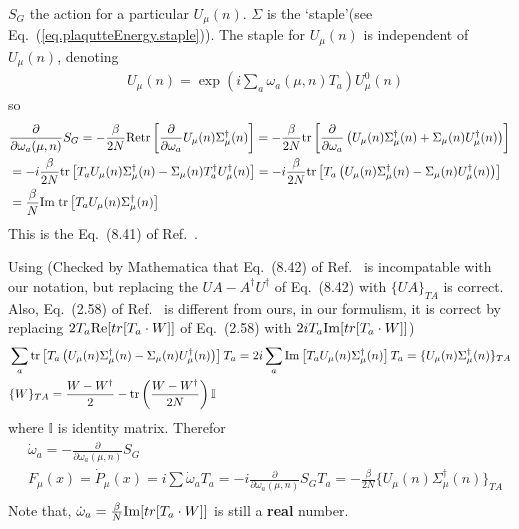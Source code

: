$S_G$ the action for a particular $U_{\mu}(n)$. $\Sigma$ is the `staple'(see Eq.~(\ref{eq.plaqutteEnergy.staple})). The staple for $U_{\mu}(n)$ is independent of $U_{\mu}(n)$, denoting
\begin{equation}
\begin{split}
&U_{\mu}(n)=\exp \left(i \sum _a\omega _a(\mu,n) T_a\right)U_{\mu}^0(n)
\end{split}
\end{equation}
so
\begin{equation}
\begin{split}
&\frac{\partial}{\partial \omega _a (\mu,n)}S_G=-\frac{\beta}{2N}{\rm Re}{\rm tr}\left[\frac{\partial}{\partial \omega _a}U_{\mu}(n)\Sigma ^{\dagger}_{\mu}(n)\right]=-\frac{\beta}{2N}{\rm tr}\left[\frac{\partial}{\partial \omega _a}\left(U_{\mu}(n)\Sigma ^{\dagger}_{\mu}(n)+\Sigma _{\mu}(n)U^{\dagger}_{\mu}(n)\right)\right]\\
&=-i\frac{\beta}{2N}{\rm tr}\left[T_aU_{\mu}(n)\Sigma ^{\dagger}_{\mu}(n)-\Sigma _{\mu}(n)T^{\dagger}_aU^{\dagger}_{\mu}(n)\right]=-i\frac{\beta}{2N}{\rm tr}\left[T_a\left(U_{\mu}(n)\Sigma ^{\dagger}_{\mu}(n)-\Sigma _{\mu}(n)U^{\dagger}_{\mu}(n)\right)\right]\\
&=\frac{\beta}{N} {\rm Im\;tr}\left[T_aU_{\mu}(n)\Sigma ^{\dagger}_{\mu}(n)\right]\\
\end{split}
\end{equation}
This is the Eq.~(8.41) of Ref.~\cite{latticeqcdbook2010}.

Using (Checked by Mathematica that Eq.~(8.42) of Ref.~\cite{latticeqcdbook2010} is incompatable with our notation, but replacing the $UA-A^{\dagger}U^{\dagger}$ of Eq.~(8.42) with $\{UA\}_{TA}$ is correct. Also, Eq.~(2.58) of Ref.~\cite{latticeqcdbook2017} is different from ours, in our formulism, it is correct by replacing $2T_a{\rm Re}[tr[T_a\cdot W]]$ of Eq.~(2.58) with $2iT_a{\rm Im}[tr[T_a\cdot W]]$)
\begin{equation}
\begin{split}
&\sum _a {\rm tr}\left[T_a\left(U_{\mu}(n)\Sigma ^{\dagger}_{\mu}(n)-\Sigma _{\mu}(n)U^{\dagger}_{\mu}(n)\right)\right]T_a=2i\sum _a{\rm Im}\left[T_aU_{\mu}(n)\Sigma ^{\dagger}_{\mu}(n)\right]T_a=\{U_{\mu}(n)\Sigma ^{\dagger}_{\mu}(n)\}_{TA}\\
&\{W\}_{TA}=\frac{W-W^{\dagger}}{2}-{\rm tr}\left(\frac{W-W^{\dagger}}{2N}\right)\mathbb{I}\\
\end{split}
\end{equation}
where $\mathbb{I}$ is identity matrix. Therefor
\begin{equation}
\begin{split}
&\dot{\omega} _a=-\frac{\partial}{\partial \omega _a (\mu,n)}S_G\\
&F_{\mu}(x)=\dot{P}_{\mu}(x)=i\sum \dot{\omega}_a T_a=-i\frac{\partial}{\partial \omega _a (\mu,n)}S_G T_a=-\frac{\beta}{2N}\{U_{\mu}(n)\Sigma ^{\dagger}_{\mu}(n)\}_{TA}\\
\end{split}
\label{eq.hmc.force}
\end{equation}
Note that, $\dot{\omega}_a=\frac{\beta}{N}{\rm Im}[tr[T_a\cdot W]]$ is still a \textbf{real} number.

